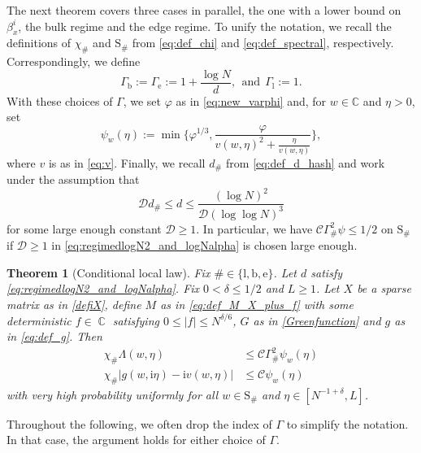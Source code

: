 \documentclass[11pt]{article}
\DeclareMathOperator{\CC}{\mathbb{C}}
\newcommand{\ii}{\mathrm{i}}
\newcommand{\abs}[1]{\left| #1 \right|}
\newcommand{\absb}[1]{\bigl| #1 \bigr|}
\newcommand{\C}{\mathbb{C}}
\theoremstyle{plain}
\newtheorem{thm}[thhm]{Theorem}
\theoremstyle{remark}
\numberwithin{equation}{section}
\begin{document}
	 The next theorem covers three cases in parallel, the one with a lower bound on $\beta_x^i$, 
	the bulk regime and the edge regime. 
	To unify the notation, we recall the definitions of $\chi_\#$ and $\mathrm{S}_\#$ from \cref{eq:def_chi} and \cref{eq:def_spectral}, respectively.
 Correspondingly, we define 
	\[ 
	\Gamma_{\mathrm{b}} :=\Gamma_{\mathrm{e}} := 1 + \frac{\log N}{d},~~\text{and}~~ \Gamma_{\mathrm{l}} :=1.
	\] 
	With these choices of $\Gamma$, we set $\varphi$ as in \cref{eq:new_varphi} and, for $w \in \C$ and $\eta >0$, set 
	\begin{equation}\label{eq:def_up_bound} 
	\psi_w(\eta) := \min \biggl\{  {\varphi}^{1/3}, \frac{ {\varphi}}{v(w,\eta)^2 + \frac{\eta}{v(w,\eta)}}\biggr\}, 
	\end{equation}
	where $v$ is as in \cref{eq:v}. Finally, we recall $d_\#$ from \cref{eq:def_d_hash}  
	and work under the assumption that 
	\begin{equation}\label{eq:regimedlogN2_and_logNalpha}
	\mathcal D d_\# \le d \le \frac{(\log N)^{2}}{\mathcal D (\log \log N)^3} 
	\end{equation}
	for some large enough constant $\mathcal D\geq 1$. 
	In particular, we have $\mathcal C \Gamma_\#^2\psi\leq 1/2$ on $\mathrm{S}_\#$ if 
	$\mathcal D \geq 1$ in \cref{eq:regimedlogN2_and_logNalpha} is chosen large enough. 
	

	
	\begin{thm}[Conditional local law]\label{thm:locallaw_edge}
	 Fix $\# \in \{ \mathrm{l}, \mathrm{b}, \mathrm{e}\}$. Let $d$ satisfy \eqref{eq:regimedlogN2_and_logNalpha}. 
		Fix $ 0 < \delta \le 1/2$ and $L \ge 1$. Let $X$ be a sparse matrix as in \cref{defiX}, define $M$ as in \eqref{eq:def_M_X_plus_f} with some deterministic $f\in \CC$ satisfying $0 \le \abs{f} \le N^{\delta/6}$, $G$ as in \eqref{Greenfunction} and $g$ as in \eqref{eq:def_g}. 
		Then  
		\begin{align} 
			\chi_\# \Lambda(w, \eta) & \leq \mathcal C\Gamma_\#^2 \psi_w(\eta) \label{eq:local_law_Lambda} \\ 
			\chi_\#  \absb{g(w,\ii \eta) - \ii v(w,\eta)} & \leq \mathcal C \psi_w(\eta)	\label{eq:loclawStieljes2} 
		\end{align}
		with very high probability uniformly for all $w \in \mathrm{S}_\#$ and $\eta \in [N^{-1 + \delta}, L]$.
	\end{thm}
	Throughout the following, we often drop the index of $\Gamma$ to simplify the notation. In that case, the argument holds for either choice of $\Gamma$.
	
\end{document}
